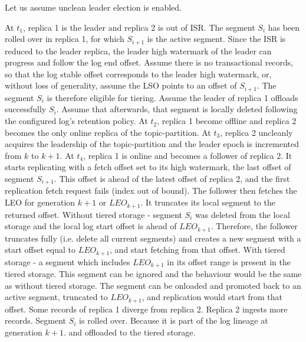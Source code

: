 \documentclass{article}
\begin{document}
Let us assume unclean leader election is enabled. 

\begin{outline}[enumerate]
	\1 At $t_1$, replica 1 is the leader and replica 2 is out of ISR. The segment $S_i$ has been rolled over in replica 1, for which $S_{i+1}$ is the active segment. Since the ISR is reduced to the leader replica, the leader high watermark of the leader can progress and follow the log end offset. Assume there is no transactional records, so that the log stable offset corresponds to the leader high watermark, or, without loss of generality, assume the LSO points to an offset of $S_{i+1}$. The segment $S_i$ is therefore eligible for tiering. Assume the leader of replica 1 offloads successfully $S_i$. Assume that afterwards, that segment is locally deleted following the configured log's retention policy.
	\1  At $t_2$, replica 1 become offline and replica 2 becomes the only online replica of the topic-partition.
	\1  At $t_3$, replica 2 uncleanly acquires the leadership of the topic-partition and the leader epoch is incremented from $k$ to $k + 1$.
	\1  At $t_4$, replica 1 is online and becomes a follower of replica 2. It starts replicating with a fetch offset set to its high watermark, the last offset of segment $S_{i+1}$. This offset is ahead of the latest offset of replica 2, and the first replication fetch request fails (index out of bound). The follower then fetches the LEO for generation $k+1$ or $LEO_{k+1}$. It truncates its local segment to the returned offset.
	\2 Without tiered storage - segment $S_i$ was deleted from the local storage and the local log start offset is ahead of $LEO_{k+1}$. Therefore, the follower truncates fully (i.e. delete all current segments) and creates a new segment with a start offset equal to $LEO_{k+1}$, and start fetching from that offset.
	\2 With tiered storage - a segment which includes $LEO_{k+1}$ in its offset range is present in the tiered storage. 
	\3 This segment can be ignored and the behaviour would be the same as without tiered storage.
	\3 The segment can be onloaded and promoted back to an active segment, truncated to $LEO_{k+1}$, and replication would start from that offset. Some records of replica 1 diverge from replica 2.
	\1 Replica 2 ingests more records. Segment $S_i$ is rolled over. Because it is part of the log lineage at generation $k+1$. and offloaded to the tiered storage.
	

	
\end{outline}
\end{document}
